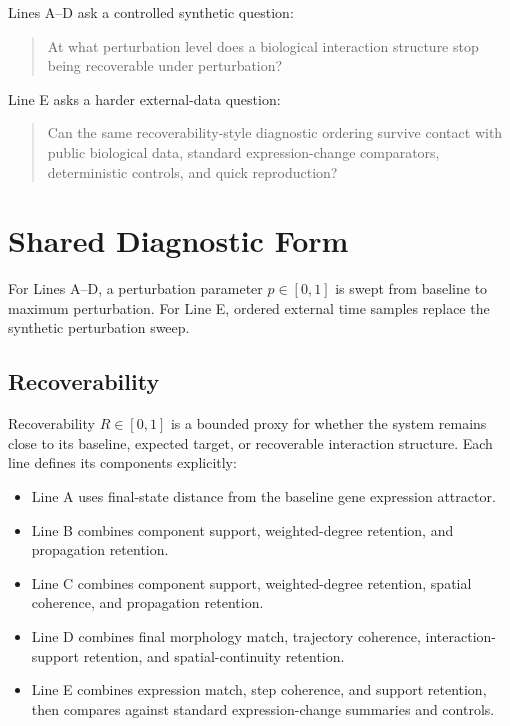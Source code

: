 \documentclass[11pt]{article}
\begin{document}
Lines A--D ask a controlled synthetic question:

\begin{quote}
At what perturbation level does a biological interaction structure stop being recoverable under perturbation?
\end{quote}

Line E asks a harder external-data question:

\begin{quote}
Can the same recoverability-style diagnostic ordering survive contact with public biological data, standard expression-change comparators, deterministic controls, and quick reproduction?
\end{quote}

\section{Shared Diagnostic Form}

For Lines A--D, a perturbation parameter \(p\in[0,1]\) is swept from baseline to maximum perturbation. For Line E, ordered external time samples replace the synthetic perturbation sweep.

\subsection{Recoverability}

Recoverability \(R\in[0,1]\) is a bounded proxy for whether the system remains close to its baseline, expected target, or recoverable interaction structure. Each line defines its components explicitly:

\begin{itemize}
\item Line A uses final-state distance from the baseline gene expression attractor.
\item Line B combines component support, weighted-degree retention, and propagation retention.
\item Line C combines component support, weighted-degree retention, spatial coherence, and propagation retention.
\item Line D combines final morphology match, trajectory coherence, interaction-support retention, and spatial-continuity retention.
\item Line E combines expression match, step coherence, and support retention, then compares against standard expression-change summaries and controls.
\end{itemize}
\end{document}
